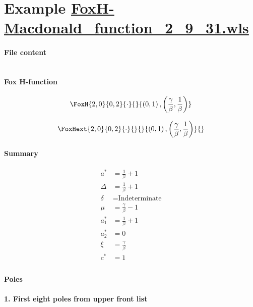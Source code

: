 \documentclass[11pt]{article}
\begin{document}
\section{Example \url{FoxH-Macdonald_function_2_9_31.wls}}

\paragraph{File content}

\inputminted{text}{FoxH-Macdonald_function_2_9_31.wls}

\paragraph{Fox H-function}

\begin{align*}
  \FoxH
    {2,0}
    {0,2}
    {\cdot}
    {}
    {\left(0, 1\right), \left(\frac{\gamma }{\beta }, \frac{1}{\beta }\right)}
\end{align*}

\begin{align*}
  \FoxHext
    {2,0}
    {0,2}
    {\cdot}
    {}
    {}
    {\left(0, 1\right), \left(\frac{\gamma }{\beta }, \frac{1}{\beta }\right)}
    {}
\end{align*}

\paragraph{Summary}

\begin{align*}
  a^*    & = \frac{1}{\beta }+1 \\
  \Delta & = \frac{1}{\beta }+1 \\
  \delta & = \text{Indeterminate} \\
  \mu    & = \frac{\gamma }{\beta }-1 \\
  a_1^*  & = \frac{1}{\beta }+1 \\
  a_2^*  & = 0 \\
  \xi    & = \frac{\gamma }{\beta } \\
  c^*    & = 1 \\
\end{align*}

\paragraph{Poles}

\noindent\textbf{1. First eight poles from upper front list}
\end{document}
